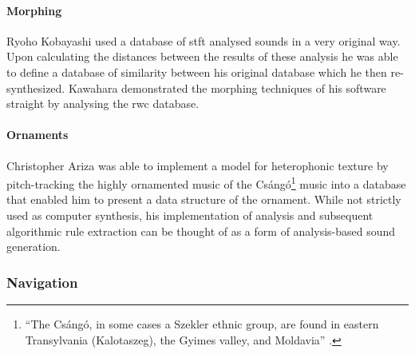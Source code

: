 \paragraph{Morphing}
Ryoho Kobayashi \parencite{icmc/bbp2372.2003.052} used a database of \gls{stft} analysed sounds in a very original way. Upon calculating the distances between the results of these analysis he was able to define a database of similarity between his original database which he then re-synthesized. Kawahara \parencite{Kawahara:2004} demonstrated the morphing techniques of his software \gls{straight} \parencite{icmc/bbp2372.1999.411} by analysing the \gls{rwc} database. 

\paragraph{Ornaments}
Christopher Ariza \parencite{icmc/bbp2372.2003.030} was able to implement a model for heterophonic texture by pitch-tracking the highly ornamented music of the Csángó\footnote{``The Csángó, in some cases a Szekler ethnic group, are found in eastern Transylvania (Kalotaszeg), the Gyimes valley, and Moldavia'' \parencite{icmc/bbp2372.2003.030}.} music into a database that enabled him to present a data structure of the ornament. While not strictly used as computer synthesis, his implementation of analysis and subsequent algorithmic rule extraction can be thought of as a form of analysis-based sound generation.

\subsubsection{Navigation}
\label{applications:navigation}

